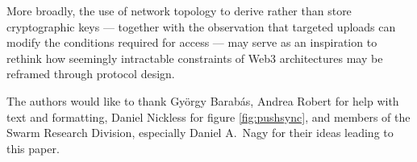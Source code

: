 \documentclass[singlecolumn]{acmart}
\begin{document}
More broadly, the use of network topology to derive rather than store cryptographic keys — together with the observation that targeted uploads can modify the conditions required for access — may serve as an inspiration to rethink how seemingly intractable constraints of Web3 architectures may be reframed through protocol design.

\begin{acks}
The authors would like to thank György Barabás, Andrea Robert for help with text and formatting, Daniel Nickless for figure \ref{fig:pushsync}, and members of the Swarm Research Division, especially Daniel A.~Nagy for their ideas leading to this paper.
\end{acks}



\end{document}
